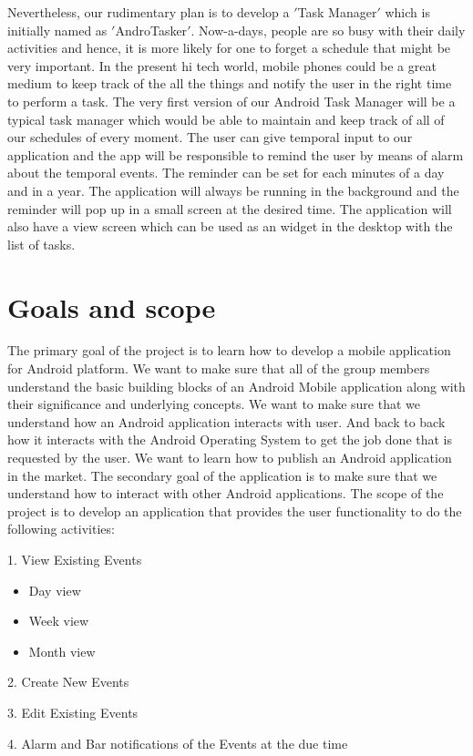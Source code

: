 \documentclass[10pt,a4paper]{report}
\begin{document}
Nevertheless, our rudimentary plan is to develop a $'$Task Manager$'$ which is initially named as $'$AndroTasker$'$. Now-a-days, people are so busy with their daily activities and hence, it is more likely for one to forget a schedule that might be very important. In the present hi tech world, mobile phones could be a great medium to keep track of the all the things and notify the user in the right time to perform a task. The very first version of our Android Task Manager will be a typical task manager which would be able to maintain and keep track of all of our schedules of every moment. The user can give temporal input to our application and the app will be responsible to remind the user by means of alarm about the temporal events. The reminder can be set for each minutes of a day and in a year. The application will always be running in the background and the reminder will pop up in a small screen at the desired time. The application will also have a view screen which can be used as an widget in the desktop with the list of tasks.




 

\section{Goals and scope}
The primary goal of the project is to learn how to develop a mobile application for Android platform. We want to make sure that all of the group members understand the basic building blocks of an Android Mobile application along with their significance and underlying concepts. We want to make sure that we understand how an Android application interacts with user. And back to back how it interacts with the Android Operating System to get the job done that is requested by the user. We want to learn how to publish an Android application in the market. The secondary goal of the application is to make sure that we understand how to interact with other Android applications. The scope of the project is to develop an application that provides the user functionality to do the following activities:

\begin{description}
 \item 1. View Existing Events
  \begin{itemize}
    \item Day view
    \item Week view
    \item Month view
  \end{itemize}
  
  \item 2. Create New Events
  \item 3. Edit Existing Events
  \item 4. Alarm and Bar notifications of the Events at the due time
\end{description}
\end{document}
